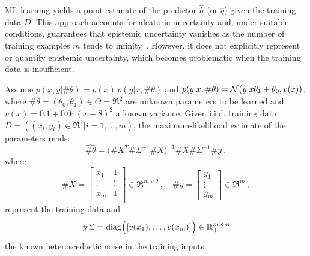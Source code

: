 
ML learning yields a point estimate of the predictor $\hat{h}$ (or $\hat{q}$) given the training data $D$. This approach accounts for aleatoric uncertainty and, under suitable conditions, guarantees that epistemic uncertainty vanishes as the number of training examples $m$ tends to infinity~\cite{Wackerly-2002}. However, it does not explicitly represent or quantify epistemic uncertainty, which becomes problematic when the training data is insufficient.%




\begin{example}Assume $p(x,y|\#\theta)=p(x)\,p(y|x,\#\theta)$
and $p(y|x,\#\theta)=\SN\big (y|x\theta_1+\theta_0,v(x)\big )$, where $\#\theta=(\theta_0,\theta_1)\in\Theta=\Re^2$ are unknown parameters to be learned and $v(x)=0.1 + 0.04(x + 8)^2$ a known variance.  Given i.i.d. training data $D=((x_i,y_i)\in\Re^2|i=1,\ldots,m)$, the maximum-likelihood estimate of the parameters reads:
\[
   \hat{\#\theta}= \big (\#X^T\#\Sigma^{-1}\#X\big )^{-1} \#X\#\Sigma^{-1}\#y \:,
\]
%
where 
\begin{equation}
\label{equ:DataXy}
\#X=\left [ \begin{array}{cc}x_1& 1\\ \vdots&\vdots \\ x_m&1\\ \end{array}\right]\in\Re^{m\times 2}\,, \quad\#y=\left [ \begin{array}{c} y_1\\ \vdots \\ y_m \end{array}\right ]\in\Re^{m}\,, 
\end{equation}
%
represent the training data and 
\begin{equation}\label{equ:DataNoise}
\#\Sigma = {\rm diag}\Big( [v(x_1),\ldots,v(x_m)]\Big )\in\Re_{+}^{m\times m}
\end{equation}
%
the known heteroscedastic noise in the training inputs.

\end{example}



